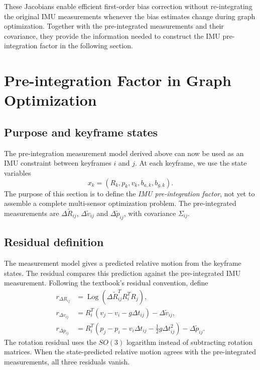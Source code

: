 \documentclass[11pt,a4paper]{article}
\newcommand{\Log}{\operatorname{Log}}
\begin{document}
These Jacobians enable efficient first-order bias correction without
re-integrating the original IMU measurements whenever the bias estimates
change during graph optimization. Together with the pre-integrated
measurements and their covariance, they provide the information needed
to construct the IMU pre-integration factor in the following section.

\section{Pre-integration Factor in Graph Optimization}
\subsection{Purpose and keyframe states}
The pre-integration measurement model derived above can now be used as
an IMU constraint between keyframes $i$ and $j$.  At each keyframe,
we use the state variables
\begin{equation}
 x_k=(R_k,p_k,v_k,b_{a,k},b_{g,k}).
\end{equation}
The purpose of this section is to define the \emph{IMU pre-integration
factor}, not yet to assemble a complete multi-sensor optimization
problem. The pre-integrated measurements are
$\Delta\tilde R_{ij}$, $\Delta\tilde v_{ij}$ and
$\Delta\tilde p_{ij}$, with covariance $\Sigma_{ij}$.

\subsection{Residual definition}
The measurement model gives a predicted relative motion from the
keyframe states. The residual compares this prediction against the
pre-integrated IMU measurement. Following the textbook's residual
convention, define
\begin{subequations}\label{eq:imu_factor_residual}
\begin{align}
 r_{\Delta R_{ij}}
 &=\Log\!\left(\Delta\tilde R_{ij}^{T}R_i^TR_j\right),\\
 r_{\Delta v_{ij}}
 &=R_i^T(v_j-v_i-g\Delta t_{ij})-\Delta\tilde v_{ij},\\
 r_{\Delta p_{ij}}
 &=R_i^T\!\left(p_j-p_i-v_i\Delta t_{ij}
 -\tfrac12g\Delta t_{ij}^{2}\right)-\Delta\tilde p_{ij}.
\end{align}
\end{subequations}
The rotation residual uses the $SO(3)$ logarithm instead of
subtracting rotation matrices. When the state-predicted relative
motion agrees with the pre-integrated measurements, all three
residuals vanish.
\end{document}
